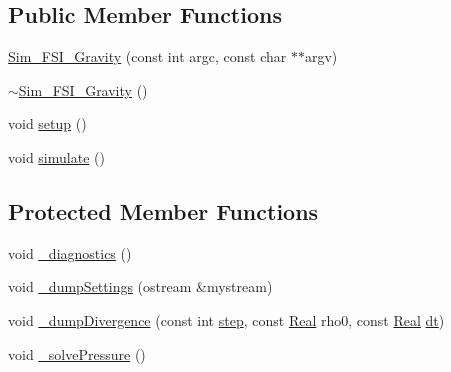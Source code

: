 \subsection*{Public Member Functions}
\begin{DoxyCompactItemize}
\item 
\hyperlink{class_sim___f_s_i___gravity_a66f07ee31fb03d03da96cb53ec48af9d}{Sim\+\_\+\+F\+S\+I\+\_\+\+Gravity} (const int argc, const char $\ast$$\ast$argv)
\item 
\hyperlink{class_sim___f_s_i___gravity_ae64d227ac1845eecae168f8293f78432}{$\sim$\+Sim\+\_\+\+F\+S\+I\+\_\+\+Gravity} ()
\item 
void \hyperlink{class_sim___f_s_i___gravity_a953c04bca39f4c6ace76c307aa00b097}{setup} ()
\item 
void \hyperlink{class_sim___f_s_i___gravity_add86d6f52de51511f0bb93714fc504c4}{simulate} ()
\end{DoxyCompactItemize}
\subsection*{Protected Member Functions}
\begin{DoxyCompactItemize}
\item 
void \hyperlink{class_sim___f_s_i___gravity_a0eb1be561cbc294534d7598b736515f0}{\+\_\+diagnostics} ()
\item 
void \hyperlink{class_sim___f_s_i___gravity_a1c0403f8126998a080e154a0d4cdbe92}{\+\_\+dump\+Settings} (ostream \&mystream)
\item 
void \hyperlink{class_sim___f_s_i___gravity_a6825457adf9b31ba9da6bc6056263852}{\+\_\+dump\+Divergence} (const int \hyperlink{class_sim___f_s_i___fixed_ab006780562c89322d5899acf98ba30fb}{step}, const \hyperlink{_h_d_f5_dumper_8h_a445a5f0e2a34c9d97d69a3c2d1957907}{Real} rho0, const \hyperlink{_h_d_f5_dumper_8h_a445a5f0e2a34c9d97d69a3c2d1957907}{Real} \hyperlink{class_sim___f_s_i___fixed_aac96337fe38ebde7c000b48e9cc8a5a9}{dt})
\item 
void \hyperlink{class_sim___f_s_i___gravity_a3bda0222882a28818ad1ecdfcf3e4ec2}{\+\_\+solve\+Pressure} ()
\end{DoxyCompactItemize}
